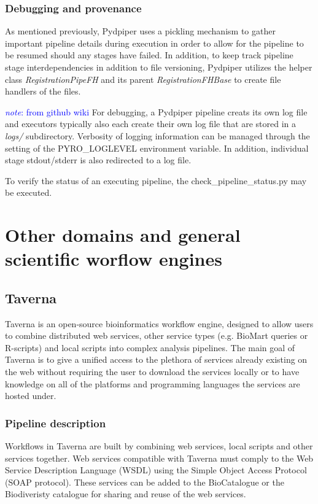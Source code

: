 \documentclass{report}
\newcommand{\note}[1]{\textcolor{blue}{\textit{note}: #1}}
\begin{document}
    
        \subsection{Debugging and provenance}

        As mentioned previously, Pydpiper uses a pickling mechanism to gather
        important pipeline details during execution in order to allow for the
        pipeline to be resumed should any stages have failed.  In addition, to
        keep track pipeline stage interdependencies in addition to file
        versioning, Pydpiper utilizes the helper class
        \textit{RegistrationPipeFH} and its parent \textit{RegistrationFHBase}
        to create file handlers of the files.

        \note{from github wiki} For debugging, a Pydpiper pipeline creats its
        own log file and executors typically also each create their own log file
        that are stored in a \textit{logs/} subdirectory. Verbosity of logging
        information can be managed through the setting of the PYRO\_LOGLEVEL
        environment variable. In addition, individual stage stdout/stderr is
        also redirected to a log file.

        To verify the status of an executing pipeline, the
        check\_pipeline\_status.py may be executed.
 

\chapter{Other domains and general scientific worflow engines} \section{Taverna}
Taverna is an open-source bioinformatics workflow engine, designed to allow
users to combine distributed web services, other service types (e.g. BioMart
queries or R-scripts) and local scripts into complex analysis pipelines. The
main goal of Taverna is to give a unified access to the plethora of services
already existing on the web without requiring the user to download the services
locally or to have knowledge on all of the platforms and programming languages
the services are hosted under.

    

        \subsection{Pipeline description} Workflows in Taverna are built by
        combining web services, local scripts and other services together. Web
        services compatible with Taverna must comply to the Web Service
        Description Language (WSDL) using the Simple Object Access Protocol
        (SOAP protocol).  These services can be added to the BioCatalogue or the
        Biodiveristy catalogue for sharing and reuse of the web services. 
\end{document}
